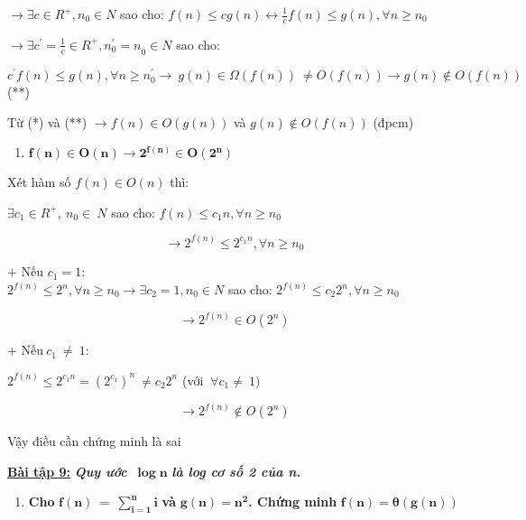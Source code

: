 \documentclass[
]{article}
\begin{document}
\(\mathbf{\rightarrow}\mathbf{\exists}c \in R^{+},n_{0} \in N\) sao cho:
\(f(n) \leq cg(n) \leftrightarrow \frac{1}{c}f(n) \leq g(n),\forall n \geq n_{0}\)

\(\mathbf{\rightarrow}\mathbf{\exists}c^{'} = \frac{1}{c} \in R^{+},{n_{0}^{'} = n}_{0} \in N\)
sao cho:

\(c^{'}f(n) \leq g(n),\forall n \geq n_{0}^{'} \rightarrow \ g(n) \in \Omega\left( f(n) \right)\  \neq O\left( f(n) \right) \rightarrow g(n) \notin O\left( f(n) \right)\)(**)

Từ (*) và (**) \(\rightarrow f(n) \in O\left( g(n) \right)\) và
\(g(n) \notin O\left( f(n) \right)\) (đpcm)

\begin{enumerate}
\item
  \(\mathbf{f}\left( \mathbf{n} \right)\mathbf{\in O}\left( \mathbf{n} \right)\mathbf{\rightarrow}\mathbf{2}^{\mathbf{f}\left( \mathbf{n} \right)}\mathbf{\in O}\left( \mathbf{2}^{\mathbf{n}} \right)\)
\end{enumerate}

Xét hàm số \(f(n) \in O(n)\) thì:

\(\exists c_{1} \in R^{+},\ n_{0} \in \ N\) sao cho:
\(f(n) \leq c_{1}n,\forall n \geq n_{0}\)

\[\rightarrow 2^{f(n)} \leq 2^{c_{1}n},\forall n \geq n_{0}\]

+ Nếu \(c_{1} = 1:\)\\
\(2^{f(n)} \leq 2^{n},\forall n \geq n_{0} \rightarrow \exists c_{2} = 1,n_{0} \in N\)
sao cho: \(2^{f(n)} \leq {c_{2}2}^{n},\forall n \geq n_{0}\)

\[\rightarrow 2^{f(n)} \in O\left( 2^{n} \right)\]

+ Nếu\({\ c}_{1}\  \neq \ 1:\)

\(2^{f(n)} \leq 2^{c_{1}n} = \left( 2^{c_{1}} \right)^{n}\  \neq {c_{2}2}^{n}\)
(với \(\ \forall c_{1} \neq \ 1)\)

\[\rightarrow 2^{f(n)} \notin O\left( 2^{n} \right)\]

Vậy điều cần chứng minh là sai

\textbf{\uline{Bài tập 9:}} \emph{\textbf{Quy ước}}
\(\mathbf{\ }\mathbf{\log}\mathbf{n}\) \emph{\textbf{là log cơ số 2 của
n.}}

\begin{enumerate}
\item
  \textbf{Cho}
  \(\mathbf{f(n)\  = \ }\sum_{\mathbf{i = 1}}^{\mathbf{n}}\mathbf{i}\)
  \textbf{và} \(\mathbf{g(n) =}\mathbf{n}^{\mathbf{2}}\)\textbf{. Chứng
  minh} \(\mathbf{f(n) = \theta(g(n))}\)
\end{enumerate}
\end{document}
